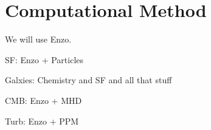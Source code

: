 \section{Computational Method}
\label{sec.method}

We will use Enzo.

SF: Enzo + Particles

Galxies: Chemistry and SF and all that stuff

CMB: Enzo  + MHD 

Turb: Enzo + PPM
